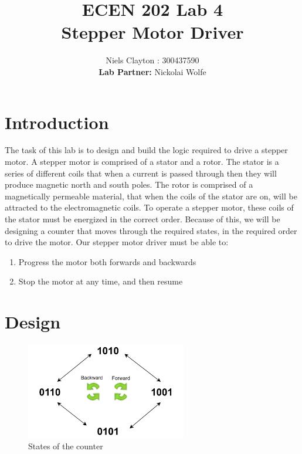 \documentclass[a4paper,11pt]{article}
\begin{document}
\title{\LARGE{\textbf{ECEN 202 Lab 4}\\Stepper Motor Driver}}
\author{Niels Clayton : 300437590\\ \textbf{Lab Partner: }Nickolai Wolfe}
\date{}
\maketitle

\section*{Introduction}
The task of this lab is to design and build the logic required to drive a stepper motor. A stepper motor is comprised of a stator and a rotor. The stator is a series of different coils that when a current is passed through then they will produce magnetic north and south poles. The rotor is comprised of a magnetically permeable material, that when the coils of the stator are on, will be attracted to the electromagnetic coils. To operate a stepper motor, these coils of the stator must be energized in the correct order. Because of this, we will be designing a counter that moves through the required states, in the required order to drive the motor. 
Our stepper motor driver must be able to:
\begin{enumerate}
\item Progress the motor both forwards and backwards
\item Stop the motor at any time, and then resume
\end{enumerate}

\section*{Design}

\begin{figure}
\includegraphics[width = 7cm]{States.png}
\caption{States of the counter}
\end{figure}
\end{document}
